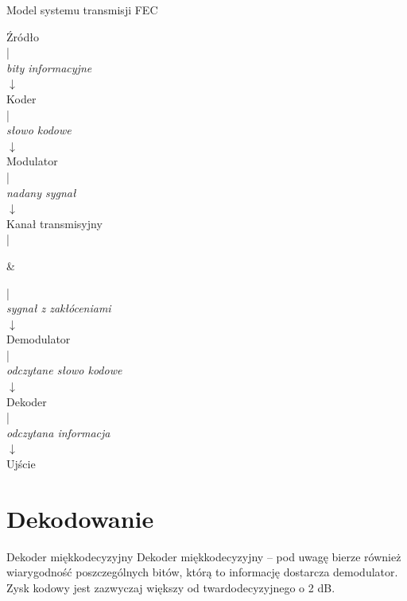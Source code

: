 \documentclass[12pt]{beamer}
\begin{document}
\begin{frame}{Model systemu transmisji FEC}
\centering
\begin{minipage}[t]{100pt}{
\centering
Źródło\\|\\ \emph{bity informacyjne}\\ $\downarrow$\\  Koder\\|\\ \emph{słowo kodowe}\\ $\downarrow$\\ Modulator\\|\\ \emph{nadany sygnał}\\ $\downarrow$\\ Kanał transmisyjny\\|\\ }
\end{minipage}
&
\begin{minipage}[t]{100pt}
\centering
|\\
\emph{sygnał z zakłóceniami} \\$\downarrow$\\
Demodulator\\|\\ \emph{odczytane słowo kodowe}\\ $\downarrow$\\ Dekoder\\|\\ \emph{odczytana informacja}\\ $\downarrow$\\ Ujście
\end{minipage}
\end{frame}


\section{Dekodowanie}
\begin{frame}{Dekoder miękkodecyzyjny}
Dekoder miękkodecyzyjny -- pod uwagę bierze również wiarygodność poszczególnych bitów, którą to informację dostarcza demodulator. Zysk kodowy jest zazwyczaj większy od twardodecyzyjnego o 2 dB.
\end{frame}
\end{document}

